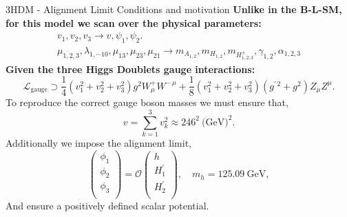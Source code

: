\documentclass[10pt,xcolor=dvipsnames,mathserif]{beamer}
\begin{document}
    

\begin{frame}{3HDM - Alignment Limit }{Conditions and motivation}
\textbf{Unlike in the B-L-SM, for this model we scan over the physical parameters:} 
    \begin{gather*}
        v_1 , v_2 , v_3 \rightarrow v, \psi_1, \psi_2. \\ \mu_{1,2,3}, \lambda_{1,\cdots 10}, \mu_{13}, \mu_{23}, \mu_{21} \rightarrow m_{A_{1,2}}, m_{H_{1,2}}, m_{H^\pm_{1,2,3}}, \gamma_{1,2}, \alpha_{1,2,3} 
    \end{gather*}
\textbf{Given the three Higgs Doublets gauge interactions:}
\begin{equation*}
\mathcal{L}_{\text{gauge}} \supset \frac{1}{4} \left( v_1^2 + v_2^2  + v_3^2 \right) g^2 W^+_\mu W^{-\,\mu} + \frac{1}{8} \left(  v_1^2 + v_2^2  + v_3^2  \right) \left( g^{\prime \, 2} + g^2 \right) Z_\mu Z^\mu  .
\end{equation*}
%
To reproduce the correct gauge boson masses we must ensure that,
%
\begin{equation*}
v= \sum_{k=1}^3 v_k^2 \approx 246^2 \ \text{(GeV)}^2  . 
\end{equation*}
Additionally we impose the alignment limit, 
\begin{equation*}
  \begin{pmatrix}
\phi_1 \\
\phi_2 \\
\phi_3 \\
\end{pmatrix} = 
\mathcal{O} \begin{pmatrix}
h \\
H_1^\prime \\
H_2^\prime \\
\end{pmatrix}  , \quad m_h = 125.09 \mathrm{\ GeV} , 
\end{equation*}
And ensure a positively defined scalar potential. 

\end{frame}
\end{document}
